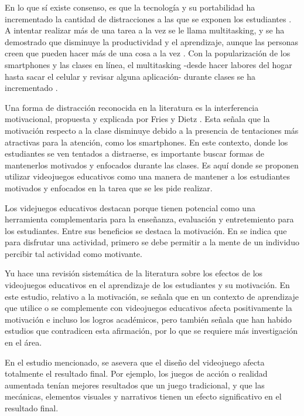 En lo que sí existe consenso, es que la tecnología y su portabilidad ha incrementado la cantidad de distracciones a las que se exponen
los estudiantes \cite{Zimmerman2011HandbookOS, Wang2022ComprehensivelySummarizeDistractions}. A intentar realizar más de una tarea a la vez se le llama multitasking, y se ha demostrado que disminuye la productividad y el aprendizaje, aunque las personas creen que pueden hacer más de una cosa a la vez \cite{Domoff2019AddictivePU}.  Con la popularización de los smartphones y las clases en línea, el multitasking -desde hacer labores del hogar hasta sacar el celular y revisar alguna aplicación- durante clases se ha incrementado \cite{Wang2022ComprehensivelySummarizeDistractions}.

Una forma de distracción reconocida en la literatura es la interferencia motivacional, propuesta y explicada por Fries y Dietz \cite{Fries2007LearningMotivationalInterference}. Esta señala que la motivación respecto a la clase disminuye debido a la presencia de tentaciones más atractivas para la atención, como los smartphones. En este contexto, donde los estudiantes se ven tentados a distraerse, es importante buscar formas de mantenerlos motivados y enfocados durante las clases. Es aquí donde se proponen utilizar videojuegos educativos como una manera de mantener a los estudiantes motivados y enfocados en la tarea que se les pide realizar.

Los videjuegos educativos destacan porque tienen potencial como una herramienta complementaria para la enseñanza, evaluación y entretemiento para los estudiantes. Entre sus beneficios se destaca la motivación. En \cite{Bisson1996FunInLEarningPedagogicalRole} se indica que para disfrutar una actividad, primero se debe permitir a la mente de un individuo percibir tal actividad como motivante. 

Yu hace una revisión sistemática de la literatura \cite{Yu2020TheEffectsOfEducationGames} sobre los efectos de los videojuegos educativos en el aprendizaje de los estudiantes y su motivación. En este estudio, relativo a la motivación, se señala que en un contexto de aprendizaje que utilice o se complemente con videojuegos educativos afecta positivamente la motivación e incluso los logros académicos, pero también señala que han habido estudios que contradicen esta afirmación, por lo que se requiere más investigación en el área. 

En el estudio mencionado, se asevera que el diseño del videojuego afecta totalmente el resultado final. Por ejemplo, los juegos de acción o realidad aumentada tenían mejores resultados que un juego tradicional, y que las mecánicas, elementos visuales y narrativos tienen un efecto significativo en el resultado final.

